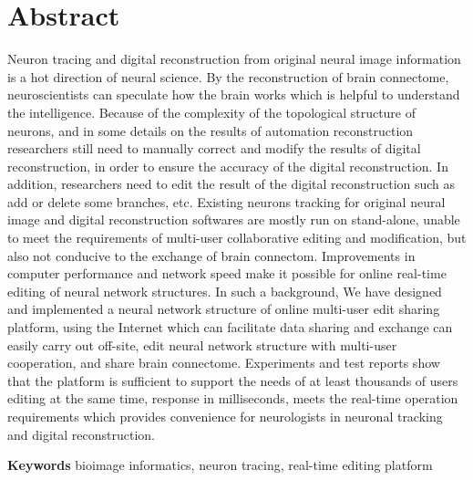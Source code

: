 \chapter{Abstract}

Neuron tracing and digital reconstruction from original neural image information is a hot direction of neural science. By the reconstruction of brain connectome, neuroscientists can speculate how the brain works which is helpful to understand the intelligence. Because of the complexity of the topological structure of neurons, and in some details on the results of automation reconstruction researchers still need to manually correct and modify the results of digital reconstruction, in order to ensure the accuracy of the digital reconstruction. In addition, researchers need to edit the result of the digital reconstruction such as add or delete some branches, etc. Existing neurons tracking for original neural image and digital reconstruction softwares are mostly run on stand-alone, unable to meet the requirements of multi-user collaborative editing and modification, but also not conducive to the exchange of brain connectom. Improvements in computer performance and network speed make it possible for online real-time editing of neural network structures. In such a background, We have designed and implemented a neural network structure of online multi-user edit sharing platform, using the Internet which can facilitate data sharing and exchange can easily carry out off-site, edit neural network structure with multi-user cooperation, and share brain connectome. Experiments and test reports show that the platform is sufficient to support the needs of at least thousands of users editing at the same time, response in milliseconds, meets the real-time operation requirements which provides convenience for neurologists in neuronal tracking and digital reconstruction.

{
    \vspace{1em}
    \setlength{\parindent}{0em}
    \textbf{Keywords} \; bioimage informatics, \;  neuron tracing, \; real-time editing platform \par
}
